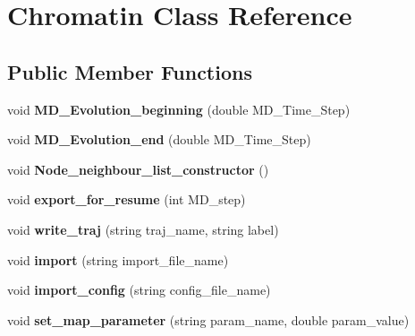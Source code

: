 \hypertarget{classChromatin}{}\section{Chromatin Class Reference}
\label{classChromatin}
\subsection*{Public Member Functions}
\begin{DoxyCompactItemize}
\item 
void {\bfseries M\+D\+\_\+\+Evolution\+\_\+beginning} (double M\+D\+\_\+\+Time\+\_\+\+Step)\hypertarget{classChromatin_a7b7d1c6dd9bbd70c9efe5cfd180dc008}{}\label{classChromatin_a7b7d1c6dd9bbd70c9efe5cfd180dc008}

\item 
void {\bfseries M\+D\+\_\+\+Evolution\+\_\+end} (double M\+D\+\_\+\+Time\+\_\+\+Step)\hypertarget{classChromatin_aeb3e8a20562ba32ee888079d1c65c4c2}{}\label{classChromatin_aeb3e8a20562ba32ee888079d1c65c4c2}

\item 
void {\bfseries Node\+\_\+neighbour\+\_\+list\+\_\+constructor} ()\hypertarget{classChromatin_ae8481ef6ce172d5e2ae50b252d234cc9}{}\label{classChromatin_ae8481ef6ce172d5e2ae50b252d234cc9}

\item 
void {\bfseries export\+\_\+for\+\_\+resume} (int M\+D\+\_\+step)\hypertarget{classChromatin_ab220d2c995636e6c2a50e5bacf6a7105}{}\label{classChromatin_ab220d2c995636e6c2a50e5bacf6a7105}

\item 
void {\bfseries write\+\_\+traj} (string traj\+\_\+name, string label)\hypertarget{classChromatin_a9361803ebebca1defa80fe0cfa19bd5e}{}\label{classChromatin_a9361803ebebca1defa80fe0cfa19bd5e}

\item 
void {\bfseries import} (string import\+\_\+file\+\_\+name)\hypertarget{classChromatin_a398e59a7a3ce36b0cb74dae0cfbba295}{}\label{classChromatin_a398e59a7a3ce36b0cb74dae0cfbba295}

\item 
void {\bfseries import\+\_\+config} (string config\+\_\+file\+\_\+name)\hypertarget{classChromatin_a6e4c5827ebb4cd31cac05c05f5999ded}{}\label{classChromatin_a6e4c5827ebb4cd31cac05c05f5999ded}

\item 
void {\bfseries set\+\_\+map\+\_\+parameter} (string param\+\_\+name, double param\+\_\+value)\hypertarget{classChromatin_a6c1fdee78f6bc75784b8d11a5073e7dc}{}\label{classChromatin_a6c1fdee78f6bc75784b8d11a5073e7dc}


\end{DoxyCompactItemize}
